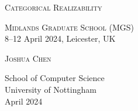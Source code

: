 \begin{titlepage}
  \large


  \vspace{6ex}

  \parbox{0.2\textwidth}{\makeicon[0.5]}
  \hfill
  \parbox{0.7\textwidth}{\huge\textsc{Categorical Realizability}}

  \vspace{2ex}

  \flushright

  {\Large\textsc{Midlands Graduate School (MGS)}} \\[1.4ex]
  8--12 April 2024, Leicester, UK

  \vfill

  \textsc{Joshua Chen}

  \vspace{4ex}

  {\normalsize{School of Computer Science \\
  University of Nottingham \\
  April 2024}}

  \vspace{0.5cm}

\end{titlepage}